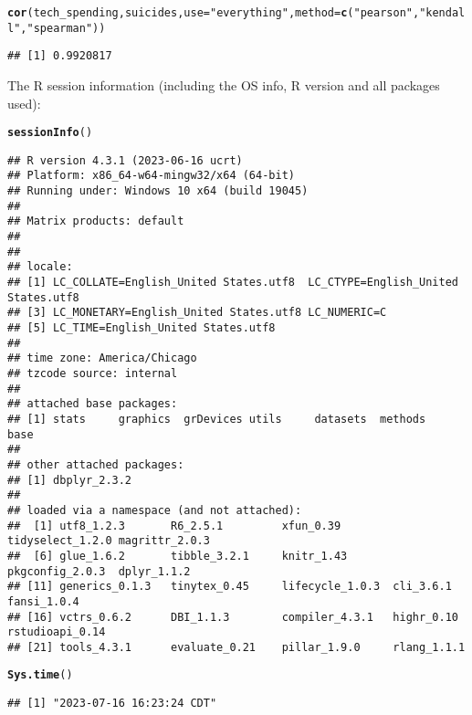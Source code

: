 \documentclass{article}\usepackage[]{graphicx}\usepackage[]{xcolor}
\makeatletter
\newcommand{\hlstr}[1]{\textcolor[rgb]{0.192,0.494,0.8}{#1}}%
\newcommand{\hlstd}[1]{\textcolor[rgb]{0.345,0.345,0.345}{#1}}%
\newcommand{\hlkwc}[1]{\textcolor[rgb]{0.333,0.667,0.333}{#1}}%
\newcommand{\hlkwd}[1]{\textcolor[rgb]{0.737,0.353,0.396}{\textbf{#1}}}%
\newenvironment{kframe}{%
 \def\at@end@of@kframe{}%
 \ifinner\ifhmode%
  \def\at@end@of@kframe{\end{minipage}}%
  \begin{minipage}{\columnwidth}%
 \fi\fi%
 \def\FrameCommand##1{\hskip\@totalleftmargin \hskip-\fboxsep
 \colorbox{shadecolor}{##1}\hskip-\fboxsep
     \hskip-\linewidth \hskip-\@totalleftmargin \hskip\columnwidth}%
 \MakeFramed {\advance\hsize-\width
   \@totalleftmargin\z@ \linewidth\hsize
   \@setminipage}}%
 {\par\unskip\endMakeFramed%
 \at@end@of@kframe}
\newenvironment{knitrout}{}{} %
\makeatother
\begin{document}
\begin{knitrout}
\begin{kframe}
\begin{alltt}
\hlkwd{cor}\hlstd{(tech_spending, suicides,} \hlkwc{use} \hlstd{=} \hlstr{"everything"}\hlstd{,} \hlkwc{method} \hlstd{=} \hlkwd{c}\hlstd{(}\hlstr{"pearson"}\hlstd{,} \hlstr{"kendall"}\hlstd{,} \hlstr{"spearman"}\hlstd{))}
\end{alltt}
\begin{verbatim}
## [1] 0.9920817
\end{verbatim}
\end{kframe}
\end{knitrout}

The R session information (including the OS info, R version and all
packages used):

\begin{knitrout}
\color{fgcolor}\begin{kframe}
\begin{alltt}
\hlkwd{sessionInfo}\hlstd{()}
\end{alltt}
\begin{verbatim}
## R version 4.3.1 (2023-06-16 ucrt)
## Platform: x86_64-w64-mingw32/x64 (64-bit)
## Running under: Windows 10 x64 (build 19045)
## 
## Matrix products: default
## 
## 
## locale:
## [1] LC_COLLATE=English_United States.utf8  LC_CTYPE=English_United States.utf8   
## [3] LC_MONETARY=English_United States.utf8 LC_NUMERIC=C                          
## [5] LC_TIME=English_United States.utf8    
## 
## time zone: America/Chicago
## tzcode source: internal
## 
## attached base packages:
## [1] stats     graphics  grDevices utils     datasets  methods   base     
## 
## other attached packages:
## [1] dbplyr_2.3.2
## 
## loaded via a namespace (and not attached):
##  [1] utf8_1.2.3       R6_2.5.1         xfun_0.39        tidyselect_1.2.0 magrittr_2.0.3  
##  [6] glue_1.6.2       tibble_3.2.1     knitr_1.43       pkgconfig_2.0.3  dplyr_1.1.2     
## [11] generics_0.1.3   tinytex_0.45     lifecycle_1.0.3  cli_3.6.1        fansi_1.0.4     
## [16] vctrs_0.6.2      DBI_1.1.3        compiler_4.3.1   highr_0.10       rstudioapi_0.14 
## [21] tools_4.3.1      evaluate_0.21    pillar_1.9.0     rlang_1.1.1
\end{verbatim}
\begin{alltt}
\hlkwd{Sys.time}\hlstd{()}
\end{alltt}
\begin{verbatim}
## [1] "2023-07-16 16:23:24 CDT"
\end{verbatim}
\end{kframe}
\end{knitrout}
\end{document}

